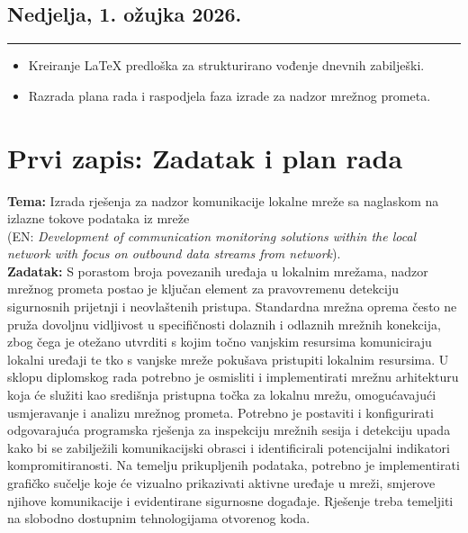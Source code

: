 \documentclass[12pt, a4paper]{article}
\newcommand{\dan}[1]{
    \subsection*{#1}
    \vspace{-0.5em} 
    \hrule \vspace{0.5em} 
}
\begin{document}
\dan{Nedjelja, 1. ožujka 2026.}
\begin{itemize}
    \item Kreiranje LaTeX predloška za strukturirano vođenje dnevnih zabilješki.
    \item Razrada plana rada i raspodjela faza izrade za nadzor mrežnog prometa.
\end{itemize}

\newpage
\section*{Prvi zapis: Zadatak i plan rada}
\textbf{Tema:} Izrada rješenja za nadzor komunikacije lokalne mreže sa naglaskom na izlazne tokove podataka iz mreže \\(EN: \textit{Development of communication monitoring solutions within the local network with focus on outbound data streams from network}). \\
\textbf{Zadatak:} S porastom broja povezanih uređaja u lokalnim mrežama, nadzor mrežnog prometa postao je ključan element za pravovremenu detekciju sigurnosnih prijetnji i neovlaštenih pristupa. Standardna mrežna oprema često ne pruža dovoljnu vidljivost u specifičnosti dolaznih i odlaznih mrežnih konekcija, zbog čega je otežano utvrditi s kojim točno vanjskim resursima komuniciraju lokalni uređaji te tko s vanjske mreže pokušava pristupiti lokalnim resursima.
U sklopu diplomskog rada potrebno je osmisliti i implementirati mrežnu arhitekturu koja će služiti kao središnja pristupna točka za lokalnu mrežu, omogućavajući usmjeravanje i analizu mrežnog prometa. Potrebno je postaviti i konfigurirati odgovarajuća programska rješenja za inspekciju mrežnih sesija i detekciju upada kako bi se zabilježili komunikacijski obrasci i identificirali potencijalni indikatori kompromitiranosti. Na temelju prikupljenih podataka, potrebno je implementirati grafičko sučelje koje će vizualno prikazivati aktivne uređaje u mreži, smjerove njihove komunikacije i evidentirane sigurnosne događaje. Rješenje treba temeljiti na slobodno dostupnim tehnologijama otvorenog koda.
\end{document}
